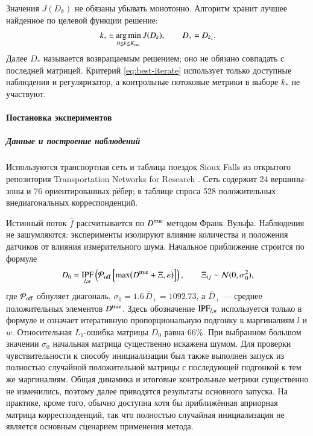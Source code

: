 \documentclass{crm-article}
\begin{document}
Значения $J(D_k)$ не обязаны убывать монотонно. Алгоритм хранит лучшее
найденное по целевой функции решение:
\begin{gather}
 k_*\in\mathop{\rm arg\,min}\limits_{0\le k\le K_{\rm out}}J(D_k),
 \qquad D_*=D_{k_*}.
 \label{eq:best-iterate}
\end{gather}
Далее $D_*$ называется возвращаемым решением; оно не обязано совпадать с
последней матрицей. Критерий \eqref{eq:best-iterate} использует только
доступные наблюдения и регуляризатор, а контрольные потоковые метрики в выборе
$k_*$ не участвуют.

\paragraph{Постановка экспериментов}

\subparagraph{Данные и построение наблюдений}

Используются транспортная сеть и таблица поездок Sioux Falls из открытого репозитория
Transportation Networks for Research \cite{LeBlanc1975,TNTP2026}.  Сеть содержит 24 вершины-зоны и 76
ориентированных рёбер; в таблице спроса 528 положительных внедиагональных
корреспонденций.

Истинный поток $\widehat f$ рассчитывается по $D^{\rm true}$ 
методом Франк--Вульфа. Наблюдения не зашумляются: эксперименты изолируют
влияние количества и положения датчиков от влияния измерительного шума.
Начальное приближение строится по формуле
\begin{gather}
 D_0=\mathop{\rm IPF}_{l,w}
 \left(\mathcal{P}_{\rm off}
 \left[\max\bigl(D^{\rm true}+\Xi,\varepsilon\bigr)\right]\right),
 \qquad
 \Xi_{ij}\sim\mathcal{N}(0,\sigma_0^2),
 \label{eq:initial-D}
\end{gather}
где $\mathcal{P}_{\rm off}$ обнуляет диагональ,
$\sigma_0=1.6\,\overline D_+=1092.73$, а $\overline D_+$ --- среднее
положительных элементов $D^{\rm true}$. Здесь обозначение $\mathop{\rm
IPF}_{l,w}$ используется только в формуле и означает итеративную
пропорциональную подгонку к маргиналиям $l$ и $w$. Относительная
$L_1$-ошибка матрицы $D_0$ равна 66\%. При выбранном большом значении
$\sigma_0$ начальная матрица существенно искажена шумом. Для проверки
чувствительности к способу инициализации был также выполнен запуск из
полностью случайной положительной матрицы с последующей подгонкой к тем же
маргиналиям. Общая динамика и итоговые контрольные метрики существенно не
изменились, поэтому далее приводятся результаты основного запуска. На
практике, кроме того, обычно доступна хотя бы приближённая априорная матрица
корреспонденций, так что полностью случайная инициализация не является
основным сценарием применения метода.
\end{document}
